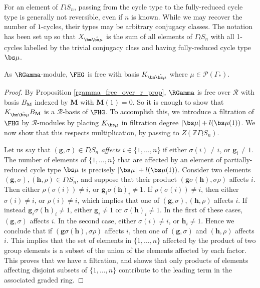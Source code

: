 For an element of $\Gamma \wr S_n$, passing from the cycle type to the fully-reduced cycle type is generally not reversible, even if $n$ is known. While we may recover the number of $1$-cycles, their types may be arbitrary conjugacy classes. The notation has been set up so that $X_{\bm\hat{\bs \mu}}$ is the sum of all elements of $\Gamma \wr S_n$ with all 1-cycles labelled by the trivial conjugacy class and having fully-reduced cycle type $\bs \mu$.

\begin{theorem}
As $\RGamma$-module, $\FHG$ is free with basis $K_{\bm \hat{\bs \mu}}$ where $\mu \in \mathcal{P}(\Gamma_*)$.
\end{theorem}
\begin{proof}
By Proposition \ref{rgamma_free_over_r_prop}, $\RGamma$ is free over $\mathcal{R}$ with basis $B_{\mathbf{M}}$ indexed by $\mathbf{M}$ with $\mathbf{M}(1) = 0$. So it is enough to show that $K_{\bm\hat{\bs\mu}}B_{\mathbf{M}}$ is a $\mathcal{R}$-basis of $\FHG$. To accomplish this, we introduce a filtration of $\FHG$ by $\mathcal{R}$-modules by placing $K_{\bs \mu}$ in filtration degree $|\bs \mu| + l(\bs\mu(1))$. We now show that this respects multiplication, by passing to $Z(\mathbb{Z} \Gamma \wr S_n)$.

Let us say that $(\mathbf{g}, \sigma) \in \Gamma \wr S_n$ \emph{affects} $i \in \{1,\ldots, n\}$ if either $\sigma(i) \neq i$, or $\mathbf{g}_i \neq 1$. The number of elements of $\{1,\ldots,n\}$ that are affected by an element of partially-reduced cycle type $\bs \mu$ is precisely $|\bs \mu| + l(\bs\mu(1))$. Consider two elements $(\mathbf{g}, \sigma), (\mathbf{h}, \rho) \in \Gamma \wr S_n$, and suppose that their product $(\mathbf{g} \sigma(\mathbf{h}), \sigma \rho)$ affects $i$. Then either $\rho(\sigma(i)) \neq i$, or $\mathbf{g}_i\sigma(\mathbf{h})_i \neq 1$. If $\rho(\sigma(i)) \neq i$, then either $\sigma(i) \neq i$, or $\rho(i) \neq i$, which implies that one of $(\mathbf{g}, \sigma), (\mathbf{h}, \rho)$ affects $i$. If instead $\mathbf{g}_i\sigma(\mathbf{h})_i \neq 1$, either $\mathbf{g}_i \neq 1$ or $\sigma(\mathbf{h})_i \neq 1$. In the first of these cases, $(\mathbf{g}, \sigma)$ affects $i$. In the second case, either $\sigma(i) \neq i$, or $\mathbf{h}_i \neq 1$. Hence we conclude that if $(\mathbf{g} \sigma(\mathbf{h}), \sigma \rho)$ affects $i$, then one of $(\mathbf{g}, \sigma)$ and $(\mathbf{h}, \rho)$ affects $i$. This implies that the set of elements in $\{1,\ldots,n\}$ affected by the product of two group elements is a subset of the union of the elements affected by each factor. This proves that we have a filtration, and shows that only products of elements affecting disjoint subsets of $\{1,\ldots,n\}$ contribute to the leading term in the associated graded ring.


\end{proof}
